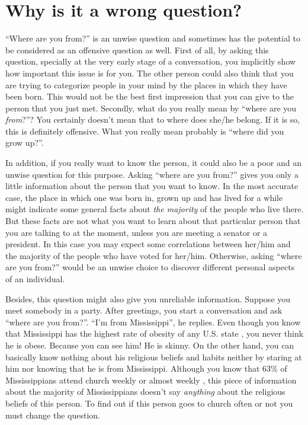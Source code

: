 \documentclass[DIV=calc, paper=a4, fontsize=11pt, twocolumn]{scrartcl}	 %
\begin{document}

\section*{Why is it a wrong question?}

``Where are you from?'' is an unwise question and sometimes has the potential to be considered as an offensive question as well. First of all, by asking this question, specially at the very early stage of a conversation, you implicitly show how important this issue is for you. The other person could also think that you are trying to categorize people in your mind by the places in which they have been born. This would not be the best first impression that you can give to the person that you just met. Secondly, what do you really mean by ``where are you \emph{from}?''? You certainly doesn't mean that to where does she/he belong. If it is so, this is definitely offensive. What you really mean probably is ``where did you grow up?''.

In addition, if you really want to know the person, it could also be a poor and an unwise question for this purpose. Asking ``where are you from?'' gives you only a little information about the person that you want to know. In the most accurate case, the place in which one was born in, grown up and has lived for a while might indicate some general facts about \emph{the majority} of the people who live there. But these facts are not what you want to learn about that particular person that you are talking to at the moment, unless you are meeting a senator or a president. In this case you may expect some correlations between her/him and the majority of the people who have voted for her/him. Otherwise, asking ``where are you from?'' would be an unwise choice to discover different personal aspects of an individual.

Besides, this question might also give you unreliable information. Suppose you meet somebody in a party. After greetings, you start a conversation and ask ``where are you from?''. ``I'm from Mississippi'', he replies. Even though you know that Mississippi has the highest rate of obesity of any U.S. state \cite{USobesity}, you never think he is obese. Because you can see him! He is skinny. On the other hand, you can basically know nothing about his religious beliefs and habits neither by staring at him nor knowing that he is from Mississippi. Although you know that 63\% of Mississippians attend church weekly or almost weekly \cite{church}, this piece of information about the majority of Mississippians doesn't say \emph{anything} about the religious beliefs of this person. To find out if this person goes to church often or not you must change the question.
\end{document}
